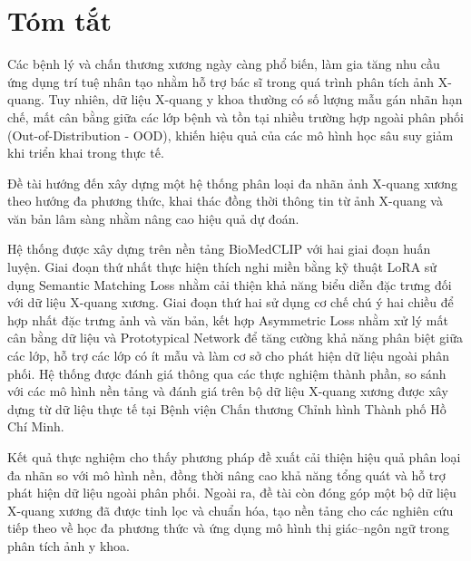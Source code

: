 \chapter*{Tóm tắt}

Các bệnh lý và chấn thương xương ngày càng phổ biến, làm gia tăng nhu cầu ứng dụng trí tuệ nhân tạo 
nhằm hỗ trợ bác sĩ trong quá trình phân tích ảnh X-quang. Tuy nhiên, dữ liệu X-quang y khoa 
thường có số lượng mẫu gán nhãn hạn chế, mất cân bằng giữa các lớp bệnh và tồn tại nhiều trường hợp ngoài phân phối 
(Out-of-Distribution - OOD), khiến hiệu quả của các mô hình học sâu suy giảm khi triển khai trong thực tế.

Đề tài hướng đến xây dựng một hệ thống phân loại đa nhãn ảnh X-quang xương theo hướng đa phương thức, 
khai thác đồng thời thông tin từ ảnh X-quang và văn bản lâm sàng nhằm nâng cao hiệu quả dự đoán.

Hệ thống được xây dựng trên nền tảng BioMedCLIP với hai giai đoạn huấn luyện. 
Giai đoạn thứ nhất thực hiện thích nghi miền bằng kỹ thuật LoRA sử dụng 
Semantic Matching Loss nhằm cải thiện khả năng biểu diễn đặc trưng đối với dữ liệu X-quang xương. 
Giai đoạn thứ hai sử dụng cơ chế chú ý hai chiều để hợp nhất đặc trưng ảnh và văn bản, 
kết hợp Asymmetric Loss nhằm xử lý mất cân bằng dữ liệu và Prototypical Network để tăng cường khả năng phân biệt giữa các lớp, 
hỗ trợ các lớp có ít mẫu và làm cơ sở cho phát hiện dữ liệu ngoài phân phối. 
Hệ thống được đánh giá thông qua các thực nghiệm thành phần, 
so sánh với các mô hình nền tảng và đánh giá trên bộ dữ liệu X-quang xương được xây dựng từ dữ liệu thực tế tại 
Bệnh viện Chấn thương Chỉnh hình Thành phố Hồ Chí Minh.

Kết quả thực nghiệm cho thấy phương pháp đề xuất cải thiện hiệu quả phân loại đa nhãn so với mô hình nền, 
đồng thời nâng cao khả năng tổng quát và hỗ trợ phát hiện dữ liệu ngoài phân phối. 
Ngoài ra, đề tài còn đóng góp một bộ dữ liệu X-quang xương đã được tinh lọc và chuẩn hóa, 
tạo nền tảng cho các nghiên cứu tiếp theo về học đa phương thức và ứng dụng mô hình thị giác–ngôn ngữ trong phân tích ảnh y khoa.
